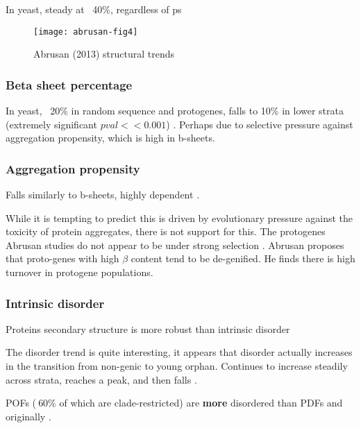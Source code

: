         In yeast, steady at ~40\%, regardless of ps
        \cite{abrusan_integration_2013} 

        \begin{figure}[h!] \centering
            \texttt{[image: abrusan-fig4]} \caption{Abrusan
            (2013) structural trends} \end{figure} \FloatBarrier


    \subsubsection{Beta sheet percentage}

        In yeast, ~20\% in random sequence and protogenes, falls to 10\% in
        lower strata (extremely significant $pval << 0.001$)
        \cite{abrusan_integration_2013}. Perhaps due to selective pressure
        against aggregation propensity, which is high in b-sheets.

    \subsubsection{Aggregation propensity}

        Falls similarly to b-sheets, highly dependent
        \cite{abrusan_integration_2013}.

        While it is tempting to predict this is driven by evolutionary
        pressure against the toxicity of protein aggregates, there is not
        support for this. The protogenes Abrusan studies do not appear to
        be under strong selection \cite{carvunis_proto-genes_2012}. Abrusan
        proposes that proto-genes with high $\beta$ content tend to be
        de-genified. He finds there is high turnover in protogene
        populations.

    \subsubsection{Intrinsic disorder}

        Proteins secondary structure is more robust than intrinsic disorder
        \cite{schaefer_protein_2010}

        The disorder trend is quite interesting, it appears that disorder
        actually increases in the transition from non-genic to young
        orphan. Continues to increase steadily across strata, reaches a
        peak, and then falls \cite{carvunis_proto-genes_2012}.

        POFs ($~$60\% of which are clade-restricted) are \textbf{more}
        disordered than PDFs \cite[review]{gollery_pofs:_2007} and
        originally \cite{gollery_what_2006}.

